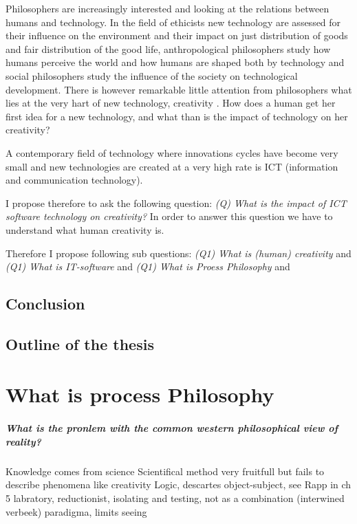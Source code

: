 \documentclass[a4paper]{Thesis}
\begin{document}
Philosophers are increasingly interested and looking at the relations between humans and technology. 
In the field of ethicists new technology are assessed for their influence on the environment and their impact on just distribution of goods and fair distribution of the good life,  anthropological philosophers study how humans perceive the world and how humans are shaped both by technology and social philosophers study the influence of the society on technological development.
There is however remarkable little attention from philosophers what lies at the very hart of new technology, creativity \cite{gaut2010philosophy}. How does a human get her first idea for a new technology, and what than is the impact of technology on her creativity?

A contemporary field of technology where innovations cycles have become very small and new technologies are created at a very high rate is ICT (information and communication technology).

I propose therefore to ask the following question:
\textit{(Q) What is the impact of ICT software technology on creativity?}
In order to answer this question we have to understand what human creativity is. 

Therefore I propose following sub questions:
\textit{(Q1) What is (human) creativity} and  
\textit{(Q1) What is IT-software} and  
\textit{(Q1) What is Proess Philosophy} and  

\section{Conclusion}

\section{Outline of the thesis}


\chapter{What is process Philosophy}

\paragraph{What is the pronlem with the common western philosophical view of reality?}
	Knowledge comes from science
	Scientifical method very fruitfull but fails to describe phenomena like creativity
		Logic, descartes object-subject, see Rapp in ch 5
		labratory, reductionist, isolating and testing, not as a combination (interwined verbeek)
		paradigma, limits seeing
		
\end{document}
